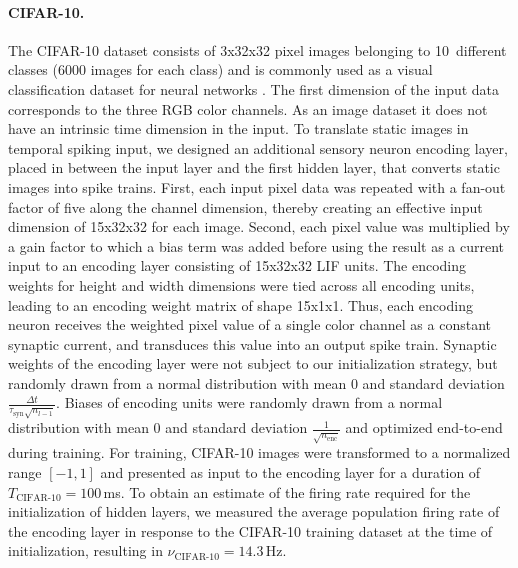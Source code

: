 \documentclass[11pt,a4paper]{article}
\begin{document}
\paragraph{CIFAR-10.} 
The CIFAR-10 dataset consists of 3x32x32 pixel images belonging to 10~different classes (6000 images for each class) and is commonly used as a visual classification dataset for neural networks \citep{Krizhevsky2009-ru}. 
The first dimension of the input data corresponds to the three RGB color channels.
As an image dataset it does not have an intrinsic time dimension in the input.
To translate static images in temporal spiking input, we designed an additional sensory neuron encoding layer, placed in between the input layer and the first hidden layer, that converts static images into spike trains. 
First, each input pixel data was repeated with a fan-out factor of five along the channel dimension, thereby creating an effective input dimension of 15x32x32 for each image.
Second, each pixel value was multiplied by a gain factor to which a bias term was added before using the result as a current input to an encoding layer consisting of 15x32x32 \ac{LIF} units. 
The encoding weights for height and width dimensions were tied across all encoding units, leading to an encoding weight matrix of shape 15x1x1.
Thus, each encoding neuron receives the weighted pixel value of a single color channel as a constant synaptic current, and transduces this value into an output spike train.
Synaptic weights of the encoding layer were not subject to our initialization strategy, but randomly drawn from a normal distribution with mean $0$ and standard deviation $\frac{\Delta t}{\tau_{\text{syn}} \sqrt{n_{l-1}}}$.  
Biases of encoding units were randomly drawn from a normal distribution with mean $0$ and standard deviation $\frac{1}{\sqrt{n_{\text{enc}}}}$ and optimized end-to-end during training.
For training, CIFAR-10 images were transformed to a normalized range $[-1, 1]$ and presented as input to the encoding layer for a duration of $T_{\text{CIFAR-10}}=100$\,ms. 
To obtain an estimate of the firing rate required for the initialization of hidden layers, we measured the average population firing rate of the encoding layer in response to the CIFAR-10 training dataset at the time of initialization, resulting in $\nu_{\text{CIFAR-10}} = 14.3$\,Hz.
\end{document}
